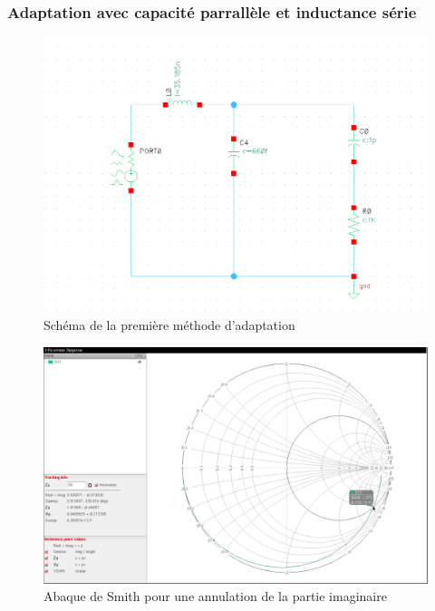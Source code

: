 \documentclass[a4paper]{article}
\begin{document}
\clearpage

\subsubsection{Adaptation avec capacit\'e parrall\`ele et inductance s\'erie}

\begin{figure}[!htb]
\begin{center}
  \includegraphics[scale=0.47]{architecture-Cparalle-Lseries.png}
  \caption{Sch\'ema de la premi\`ere m\'ethode d'adaptation}
\end{center}
\end{figure}

\begin{figure}[!htb]
\begin{center}
  \includegraphics[width=\linewidth]{smith-capa-parallele-1st-adapt.png}
  \caption{Abaque de Smith pour une annulation de la partie imaginaire}
\end{center}
\end{figure}
\end{document}
